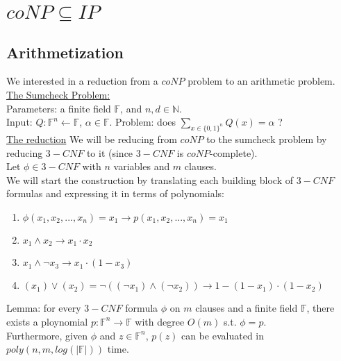 \section*{$coNP\subseteq IP$}
\subsection*{Arithmetization}
We interested in a reduction from a $coNP$ problem to an arithmetic
problem.\\

\underline{The Sumcheck Problem:}\\
Parameters: a finite field $\mathbb{F}$, and $n,d\in\mathbb{N}$.\\
Input: $Q:\mathbb{F}^n\leftarrow\mathbb{F}$, $\alpha\in\mathbb{F}$.
Problem: does $\sum_{x\in\{0,1\}^n}Q(x)=\alpha$ ?\\

\underline{The reduction}
We will be reducing from $coNP$ to the sumcheck problem
by reducing $3-CNF$ to it (since $3-CNF$ is $coNP$-complete).\\
Let $\phi\in 3-CNF$ with $n$ variables and $m$ clauses.\\
We will start the construction by translating each building block
of $3-CNF$ formulas and expressing it in terms of polynomials:
\begin{enumerate}
	\item $\phi(x_1,x_2,...,x_n)=x_1\longrightarrow p(x_1,x_2,...,x_n)=x_1$
	\item $x_1\wedge x_2 \longrightarrow x_1\cdot x_2$
	\item $x_1\wedge \neg x_3\longrightarrow x_1\cdot(1-x_3)$
	\item $(x_1)\vee (x_2)=\neg((\neg x_1)\wedge(\neg x_2))\longrightarrow 1-(1-x_1)\cdot(1-x_2)$
\end{enumerate}
Lemma: for every $3-CNF$ formula $\phi$ on $m$ clauses and a finite field $\mathbb{F}$,
there exists a ploynomial $p:\mathbb{F}^n\rightarrow\mathbb{F}$ with degree $O(m)$ s.t.
$\phi=p$.\\
Furthermore, given $\phi$ and $z\in\mathbb{F}^n$, $p(z)$ can be
evaluated in $poly(n,m,log(|\mathbb{F}|))$ time.